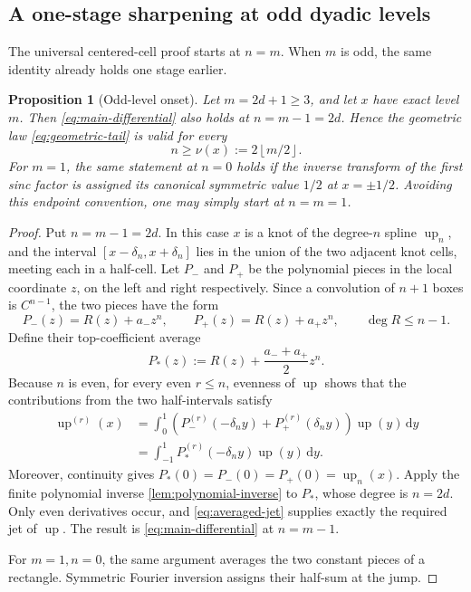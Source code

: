 \documentclass[11pt,oneside]{article}
\newtheorem{proposition}[theorem]{Proposition}
\theoremstyle{definition}
\theoremstyle{remark}
\newcommand{\up}{\operatorname{up}}
\newcommand{\dd}{\,\mathrm d}
\newcommand{\floor}[1]{\left\lfloor#1\right\rfloor}
\begin{document}
\subsection{A one-stage sharpening at odd dyadic levels}

The universal centered-cell proof starts at \(n=m\).  When \(m\) is odd, the
same identity already holds one stage earlier.

\begin{proposition}[Odd-level onset]\label{prop:odd-onset}
Let \(m=2d+1\ge3\), and let \(x\) have exact level \(m\).  Then
\eqref{eq:main-differential} also holds at \(n=m-1=2d\).  Hence the geometric
law \eqref{eq:geometric-tail} is valid for every
\begin{equation}\label{eq:nu-onset}
 n\ge\nu(x):=2\floor{m/2}.
\end{equation}
For \(m=1\), the same statement at \(n=0\) holds if the inverse transform of
the first sinc factor is assigned its canonical symmetric value \(1/2\) at
\(x=\pm1/2\).  Avoiding this endpoint convention, one may simply start at
\(n=m=1\).
\end{proposition}

\begin{proof}
Put \(n=m-1=2d\).  In this case \(x\) is a knot of the degree-\(n\) spline
\(\up_n\), and the interval \([x-\delta_n,x+\delta_n]\) lies in the union of the two
adjacent knot cells, meeting each in a half-cell.  Let \(P_-\) and \(P_+\) be the polynomial pieces in the
local coordinate \(z\), on the left and right respectively.  Since a
convolution of \(n+1\) boxes is \(C^{n-1}\), the two pieces have the form
\begin{equation}\label{eq:two-pieces}
 P_-(z)=R(z)+a_-z^n,
 \qquad
 P_+(z)=R(z)+a_+z^n,
 \qquad \deg R\le n-1.
\end{equation}
Define their top-coefficient average
\begin{equation}\label{eq:P-star}
 P_*(z):=R(z)+\frac{a_-+a_+}{2}z^n.
\end{equation}
Because \(n\) is even, for every even \(r\le n\), evenness of \(\up\) shows
that the contributions from the two half-intervals satisfy
\begin{align}\label{eq:averaged-jet}
 \up^{(r)}(x)
 &=\int_0^1
 \left(P_-^{(r)}(-\delta_ny)+P_+^{(r)}(\delta_ny)\right)\up(y)\dd y\\
 &=\int_{-1}^{1}P_*^{(r)}(-\delta_ny)\up(y)\dd y.
\end{align}
Moreover, continuity gives \(P_*(0)=P_-(0)=P_+(0)=\up_n(x)\).  Apply the
finite polynomial inverse \cref{lem:polynomial-inverse} to \(P_*\), whose
degree is \(n=2d\).  Only even derivatives occur, and
\eqref{eq:averaged-jet} supplies exactly the required jet of \(\up\).  The
result is \eqref{eq:main-differential} at \(n=m-1\).

For \(m=1,n=0\), the same argument averages the two constant pieces of a
rectangle.  Symmetric Fourier inversion assigns their half-sum at the jump.
\end{proof}
\end{document}
